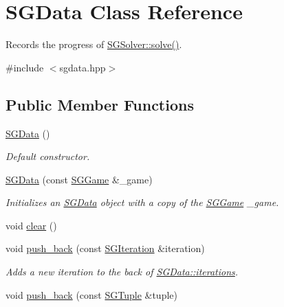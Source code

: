 \hypertarget{classSGData}{\section{S\-G\-Data Class Reference}
\label{classSGData}
}


Records the progress of \hyperlink{classSGSolver_a220dd431eabdd9ff8419fafb28b7b990}{S\-G\-Solver\-::solve()}.  




{\ttfamily \#include $<$sgdata.\-hpp$>$}

\subsection*{Public Member Functions}
\begin{DoxyCompactItemize}
\item 
\hypertarget{classSGData_a41e10854736292614805d6002d36c653}{\hyperlink{classSGData_a41e10854736292614805d6002d36c653}{S\-G\-Data} ()}\label{classSGData_a41e10854736292614805d6002d36c653}

\begin{DoxyCompactList}\small\item\em Default constructor. \end{DoxyCompactList}\item 
\hypertarget{classSGData_aaa0dab45f91e7da521ae8b8dc80d113d}{\hyperlink{classSGData_aaa0dab45f91e7da521ae8b8dc80d113d}{S\-G\-Data} (const \hyperlink{classSGGame}{S\-G\-Game} \&\-\_\-game)}\label{classSGData_aaa0dab45f91e7da521ae8b8dc80d113d}

\begin{DoxyCompactList}\small\item\em Initializes an \hyperlink{classSGData}{S\-G\-Data} object with a copy of the \hyperlink{classSGGame}{S\-G\-Game} \-\_\-game. \end{DoxyCompactList}\item 
void \hyperlink{classSGData_a88d87798514fa3b3470442976db2afff}{clear} ()
\item 
\hypertarget{classSGData_ac2162c25f0aebe80783efe0b5349032e}{void \hyperlink{classSGData_ac2162c25f0aebe80783efe0b5349032e}{push\-\_\-back} (const \hyperlink{classSGIteration}{S\-G\-Iteration} \&iteration)}\label{classSGData_ac2162c25f0aebe80783efe0b5349032e}

\begin{DoxyCompactList}\small\item\em Adds a new iteration to the back of \hyperlink{classSGData_a6361bae00b7e2dcf0c8c0d52ad330314}{S\-G\-Data\-::iterations}. \end{DoxyCompactList}\item 
\hypertarget{classSGData_afe988c0a8dd7c71a9dd61fccfe5b3876}{void \hyperlink{classSGData_afe988c0a8dd7c71a9dd61fccfe5b3876}{push\-\_\-back} (const \hyperlink{classSGTuple}{S\-G\-Tuple} \&tuple)}\label{classSGData_afe988c0a8dd7c71a9dd61fccfe5b3876}


\end{DoxyCompactItemize}
